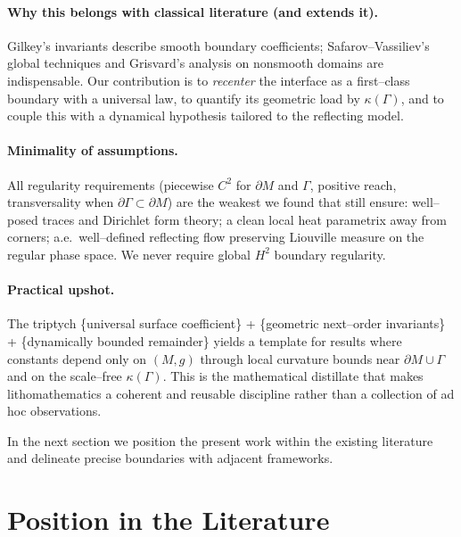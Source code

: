 \paragraph{Why this belongs with classical literature (and extends it).}
Gilkey’s invariants describe smooth boundary coefficients; Safarov–Vassiliev’s global techniques and Grisvard’s analysis on nonsmooth domains are indispensable. Our contribution is to \emph{recenter} the interface as a first–class boundary with a universal law, to quantify its geometric load by $\kappa(\Gamma)$, and to couple this with a dynamical hypothesis tailored to the reflecting model.

\paragraph{Minimality of assumptions.}
All regularity requirements (piecewise $C^2$ for $\partial M$ and $\Gamma$, positive reach, transversality when $\partial\Gamma\subset\partial M$) are the weakest we found that still ensure:
well–posed traces and Dirichlet form theory; a clean local heat parametrix away from corners; a.e.\ well–defined reflecting flow preserving Liouville measure on the regular phase space. We never require global $H^2$ boundary regularity.

\paragraph{Practical upshot.}
The triptych \{universal surface coefficient\} + \{geometric next–order invariants\} + \{dynamically bounded remainder\} yields a template for results where constants depend only on $(M,g)$ through local curvature bounds near $\partial M\cup\Gamma$ and on the scale–free $\kappa(\Gamma)$. This is the mathematical distillate that makes lithomathematics a coherent and reusable discipline rather than a collection of ad hoc observations.

\medskip
In the next section we position the present work within the existing literature and delineate precise boundaries with adjacent frameworks.


\section{Position in the Literature}\label{sec:lit-position}


